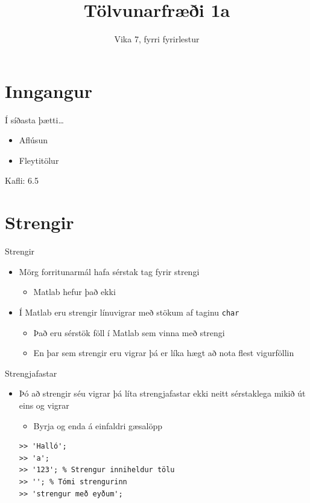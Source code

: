 \documentclass{beamer}
\title{Tölvunarfræði 1a}
\subtitle{Vika 7, fyrri fyrirlestur}
\begin{document}
\begin{frame}
\titlepage
\end{frame}

\section{Inngangur}

\begin{frame}{Í síðasta þætti\ldots}
\begin{itemize}
 \item Aflúsun
 \item Fleytitölur
\end{itemize}
Kafli: 6.5
\end{frame}

\section{Strengir}

\begin{frame}{Strengir}
\begin{itemize}
 \item Mörg forritunarmál hafa sérstak tag fyrir strengi
 \begin{itemize}
  \item Matlab hefur það ekki
 \end{itemize}
 \item Í Matlab eru strengir línuvigrar með stökum af taginu \texttt{char}
 \begin{itemize}
  \item Það eru sérstök föll í Matlab sem vinna með strengi
  \item En þar sem strengir eru vigrar þá er líka hægt að nota flest vigurföllin
 \end{itemize}
\end{itemize}
\end{frame}

\begin{frame}[fragile]{Strengjafastar}
\begin{itemize}
 \item Þó að strengir séu vigrar þá líta strengjafastar ekki neitt sérstaklega mikið út eins og vigrar
 \begin{itemize}
  \item Byrja og enda á einfaldri gæsalöpp
 \end{itemize}
\begin{verbatim}
>> 'Halló';
>> 'a';
>> '123'; % Strengur inniheldur tölu
>> ''; % Tómi strengurinn
>> 'strengur með eyðum';
\end{verbatim}
\end{itemize}
\end{frame}
\end{document}
